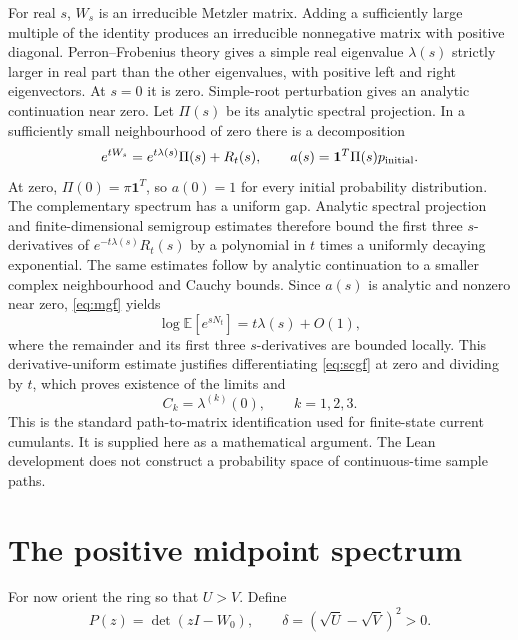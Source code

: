 \documentclass[11pt,a4paper]{article}
\numberwithin{equation}{section}
\theoremstyle{remark}
\newcommand{\E}{\mathbb E}
\newcommand{\Id}{I}
\begin{document}
For real $s$, $W_s$ is an irreducible Metzler matrix. Adding a sufficiently
large multiple of the identity produces an irreducible nonnegative matrix
with positive diagonal. Perron--Frobenius theory gives a simple real
eigenvalue $\lambda(s)$ strictly larger in real part than the other
eigenvalues, with positive left and right eigenvectors. At $s=0$ it is zero.
Simple-root perturbation gives an analytic continuation near zero. Let
$\Pi(s)$ be its analytic spectral projection. In a sufficiently small
neighbourhood of zero there is a decomposition
\[
 e^{tW_s}=e^{t\lambda(s)}\Pi(s)+R_t(s),\qquad
 a(s)=\mathbf1^T\Pi(s)p_{\rm initial}.
\]
At zero, $\Pi(0)=\pi\mathbf1^T$, so $a(0)=1$ for every initial probability
distribution. The complementary spectrum has a uniform gap. Analytic
spectral projection and finite-dimensional semigroup estimates therefore
bound the first three $s$-derivatives of $e^{-t\lambda(s)}R_t(s)$ by a
polynomial in $t$ times a uniformly decaying exponential. The same estimates
follow by analytic continuation to a smaller complex neighbourhood and
Cauchy bounds. Since $a(s)$ is analytic and nonzero near zero,
\eqref{eq:mgf} yields
\begin{equation}\label{eq:scgf}
  \log\E[e^{sN_t}]=t\lambda(s)+O(1),
\end{equation}
where the remainder and its first three $s$-derivatives are bounded locally.
This derivative-uniform estimate justifies differentiating
\eqref{eq:scgf} at zero and dividing by $t$, which proves existence of the
limits and
\begin{equation}\label{eq:identification}
  C_k=\lambda^{(k)}(0),\qquad k=1,2,3.
\end{equation}
This is the standard path-to-matrix identification used for finite-state
current cumulants. It is supplied here as a mathematical argument. The
Lean development does not construct a probability space of continuous-time
sample paths.

\section{The positive midpoint spectrum}\label{sec:spectrum}

For now orient the ring so that $U>V$. Define
\begin{equation}\label{eq:Pdelta}
  P(z)=\det(z\Id-W_0),\qquad
  \delta=(\sqrt U-\sqrt V)^2>0.
\end{equation}
\end{document}
